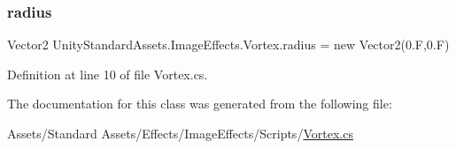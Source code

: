 \subsubsection{\texorpdfstring{radius}{radius}}
{\footnotesize\ttfamily Vector2 Unity\+Standard\+Assets.\+Image\+Effects.\+Vortex.\+radius = new Vector2(0.\+F,0.\+F)}



Definition at line 10 of file Vortex.\+cs.



The documentation for this class was generated from the following file\+:\begin{DoxyCompactItemize}
\item 
Assets/\+Standard Assets/\+Effects/\+Image\+Effects/\+Scripts/\mbox{\hyperlink{_vortex_8cs}{Vortex.\+cs}}\end{DoxyCompactItemize}
